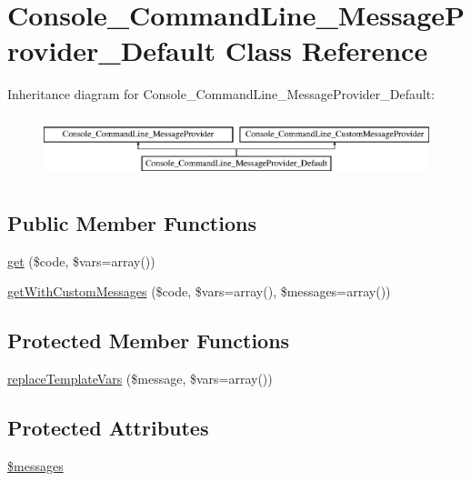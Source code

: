 \hypertarget{class_console___command_line___message_provider___default}{
\section{Console\_\-CommandLine\_\-MessageProvider\_\-Default Class Reference}
\label{class_console___command_line___message_provider___default}
}
Inheritance diagram for Console\_\-CommandLine\_\-MessageProvider\_\-Default:\begin{figure}[H]
\begin{center}
\leavevmode
\includegraphics[height=1.830065cm]{class_console___command_line___message_provider___default}
\end{center}
\end{figure}
\subsection*{Public Member Functions}
\begin{DoxyCompactItemize}
\item 
\hyperlink{class_console___command_line___message_provider___default_af448a5f2e64ff7a482a69ea3197d0389}{get} (\$code, \$vars=array())
\item 
\hyperlink{class_console___command_line___message_provider___default_acdb5c6fb4f925e7b0c846875d1cc8186}{getWithCustomMessages} (\$code, \$vars=array(), \$messages=array())
\end{DoxyCompactItemize}
\subsection*{Protected Member Functions}
\begin{DoxyCompactItemize}
\item 
\hyperlink{class_console___command_line___message_provider___default_af7d8089e2f5a59a12cbf6ae46ea7b7aa}{replaceTemplateVars} (\$message, \$vars=array())
\end{DoxyCompactItemize}
\subsection*{Protected Attributes}
\begin{DoxyCompactItemize}
\item 
\hyperlink{class_console___command_line___message_provider___default_aaf8d38bd4e7d07a3d97cc2f497f6d13f}{\$messages}
\end{DoxyCompactItemize}


